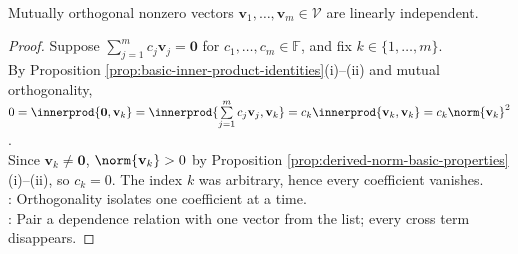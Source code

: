 \begin{proposition} \label{prop:mutually-orthogonal-nonzero-vectors-independent} \\
Mutually orthogonal nonzero vectors $\mathbf{v}_1,\ldots,\mathbf{v}_m\in\mathcal{V}$ are linearly independent.
\begin{proof}
Suppose $\sum\limits_{j=1}^{m}c_j\mathbf{v}_j=\mathbf{0}$ for $c_1,\ldots,c_m\in\mathbb{F}$, and fix $k\in\{1,\ldots,m\}$.\\
By Proposition \ref{prop:basic-inner-product-identities}(i)--(ii) and mutual orthogonality, $0=\innerprod{\mathbf{0},\mathbf{v}_k}=\innerprod{\sum\limits_{j=1}^{m}c_j\mathbf{v}_j,\mathbf{v}_k}=c_k\innerprod{\mathbf{v}_k,\mathbf{v}_k}=c_k\norm{\mathbf{v}_k}^2$.\\
Since $\mathbf{v}_k\neq\mathbf{0}$, $\norm{\mathbf{v}_k}>0$ by Proposition \ref{prop:derived-norm-basic-properties}(i)--(ii), so $c_k=0$. The index $k$ was arbitrary, hence every coefficient vanishes.\\
: Orthogonality isolates one coefficient at a time.\\
: Pair a dependence relation with one vector from the list; every cross term disappears.
\end{proof}
\end{proposition}
